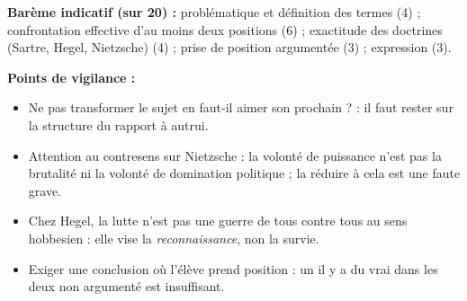 \documentclass[11pt]{article}
\begin{document}
\begin{corrige}
\textbf{Barème indicatif (sur 20) :} problématique et définition des termes (4) ; confrontation effective d'au moins deux positions (6) ; exactitude des doctrines (Sartre, Hegel, Nietzsche) (4) ; prise de position argumentée (3) ; expression (3).

\textbf{Points de vigilance :}
\begin{itemize}
\item Ne pas transformer le sujet en \guillemotleft faut-il aimer son prochain ? \guillemotright : il faut rester sur la structure du rapport à autrui.
\item Attention au contresens sur Nietzsche : la volonté de puissance n'est pas la brutalité ni la volonté de domination politique ; la réduire à cela est une faute grave.
\item Chez Hegel, la lutte n'est pas une guerre de tous contre tous au sens hobbesien : elle vise la \emph{reconnaissance}, non la survie.
\item Exiger une conclusion où l'élève prend position : un \guillemotleft il y a du vrai dans les deux \guillemotright non argumenté est insuffisant.
\end{itemize}
\end{corrige}
\end{document}
